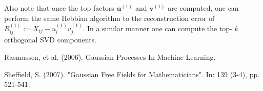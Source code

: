 \documentclass[11pt]{article}
\theoremstyle{plain} %
\theoremstyle{remark}
\begin{document}
Also note that once the top factors $\mathbf{u}^{(1)}$ and $\mathbf{v}^{(1)}$ are computed, one can perform the same Hebbian algorithm to the reconstruction error of $R_{i j}^{(1)}:=X_{i j}-u_{i}^{(1)} v_{j}^{(1)}$. In a similar manner one can compute the top- $k$ orthogonal SVD components.



\begin{thebibliography}{2}
  Rasmussen, et al. (2006). Gaussian Processes In Machine Learning.

  Sheffield, S. (2007). "Gaussian Free Fields for Mathematicians". In: 139 (3-4), pp. 521-541.
\end{thebibliography}
\end{document}
